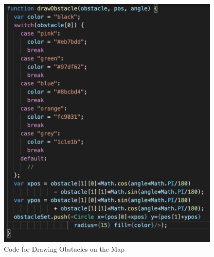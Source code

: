 \documentclass[a4paper]{article}
\begin{document}
\begin{figure}[H]
	\begin{Center}
		\includegraphics[width = 0.4\linewidth]{./images/DrawObstacle.png}
		\caption{Code for Drawing Obstacles on the Map}
        \label{fig:drawobstaclecode}
	\end{Center}
\end{figure}
\end{document}
